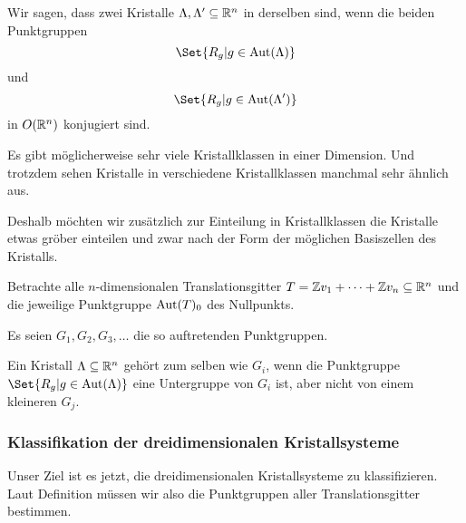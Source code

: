 \begin{definition}[Kristallklassen]
Wir sagen, dass zwei Kristalle $\Lambda,\Lambda'\subseteq\mathbb{R}^n$ in derselben  sind, wenn die beiden Punktgruppen
\[\Set{R_g | g\in\Aut(\Lambda)}\]
und
\[\Set{R_g | g\in\Aut(\Lambda')}\]
in $O(\mathbb{R}^n)$ konjugiert sind.
\end{definition}

\begin{remark}
Es gibt möglicherweise sehr viele Kristallklassen in einer Dimension. Und trotzdem sehen Kristalle in verschiedene Kristallklassen manchmal sehr ähnlich aus.

Deshalb möchten wir zusätzlich zur Einteilung in Kristallklassen die Kristalle etwas gröber einteilen und zwar nach der Form der möglichen Basiszellen des Kristalls.
\end{remark}

\begin{definition}[Kristallsysteme]
Betrachte alle $n$-dimensionalen Translationsgitter $T=\mathbb{Z} v_1+\cdots+\mathbb{Z} v_n\subseteq\mathbb{R}^n$ und die jeweilige Punktgruppe $\operatorname{Aut}(T)_0$ des Nullpunkts.

Es seien $G_1, G_2, G_3, \ldots$ die so auftretenden Punktgruppen.

Ein Kristall $\Lambda\subseteq\mathbb{R}^n$ gehört zum selben  wie $G_i$, wenn die Punktgruppe $\Set{R_g | g\in\Aut(\Lambda)}$ eine Untergruppe von $G_i$ ist, aber nicht von einem kleineren $G_j$.
\end{definition}

\subsubsection{Klassifikation der dreidimensionalen Kristallsysteme}

\begin{remark}
Unser Ziel ist es jetzt, die dreidimensionalen Kristallsysteme zu klassifizieren. Laut Definition müssen wir also die Punktgruppen aller Translationsgitter bestimmen.
\end{remark}

